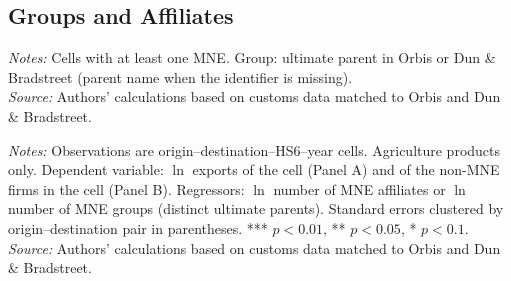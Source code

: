 \documentclass[11pt,a4paper]{article}
\begin{document}
\subsection{Groups and Affiliates}
\begin{table}[H]\centering\small%
  \caption{Agriculture: Multinational Affiliates and Groups in Origin--Destination--Product--Year Cells}%
  \label{tab:grp_agro}%
  \par\vspace{3pt}%
  \begin{minipage}{0.95\textwidth}\footnotesize %
  \textit{Notes:} Cells with at least one MNE. Group: ultimate parent in Orbis or Dun \& Bradstreet (parent name when the identifier is missing).\\[3pt]%
  \textit{Source:} Authors' calculations based on customs data matched to Orbis and Dun \& Bradstreet.%
  \end{minipage}%
  \end{table}
\begin{table}[H]\centering\small%
  \caption{Agriculture: Multinational Presence and Exports: Affiliates and Groups}%
  \label{tab:grp_r_agro}%
  \par\vspace{3pt}%
  \begin{minipage}{0.95\textwidth}\footnotesize %
  \textit{Notes:} Observations are origin--destination--HS6--year cells. Agriculture products only. Dependent variable: $\ln$ exports of the cell (Panel A) and of the non-MNE firms in the cell (Panel B). Regressors: $\ln$ number of MNE affiliates or $\ln$ number of MNE groups (distinct ultimate parents). Standard errors clustered by origin--destination pair in parentheses. *** $p<0.01$, ** $p<0.05$, * $p<0.1$.\\[3pt]%
  \textit{Source:} Authors' calculations based on customs data matched to Orbis and Dun \& Bradstreet.%
  \end{minipage}%
  \end{table}
\end{document}
